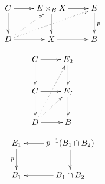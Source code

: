 \documentclass{article}
\newtheorem{proposed work}[theorem]{Proposed Work}
\newcommand{\xymat}[1]{\begin{align*}\xymatrix{ #1}\end{align*}}
\begin{document}

\xymat{
C \ar[r] \ar[d] & E\times_B X \ar[d] \ar[r] &E\ar[d]^p\\ 
D \ar[r]\ar@{.>}[ur]\ar@{.>}[urr] & X\ar[r] & B} 

\xymat{
C \ar[r]\ar[d] & E_2 \ar[d]\\
C \ar[r]\ar[d] & E_{?}\ar[d]\\
D \ar[r] \ar@{.>}[ur]\ar@{.>}[uur] & B\\
}

\xymat{
E_1\ar[d]_p  & p^{-1}(B_1\cap B_2)\ar[d]\ar[l]\\
B_1 & B_1\cap B_2\ar[l]
}


\printbibliography
\end{document}
